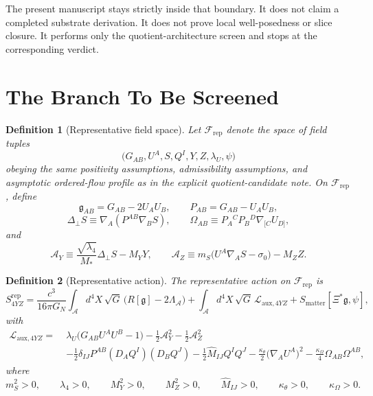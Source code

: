 \documentclass[11pt]{article}
\newcommand{\Sub}{\mathcal{A}}
\newcommand{\BridgeMetric}{\mathfrak{g}}
\newcommand{\AY}{\mathcal A_Y}
\newcommand{\AZ}{\mathcal A_Z}
\newcommand{\FieldSpace}{\mathscr F}
\newcommand{\RepFieldSpace}{\FieldSpace_{\mathrm{rep}}}
\newtheorem{definition}{Definition}
\begin{document}
The present manuscript stays strictly inside that boundary. It does not claim a completed substrate derivation. It does not prove local well-posedness or slice closure. It performs only the quotient-architecture screen and stops at the corresponding verdict.

\section{The Branch To Be Screened}

\begin{definition}[Representative field space]
\label{def:repfield}
Let \(\RepFieldSpace\) denote the space of field tuples
\[
\bigl(G_{AB},U^A,S,Q^I,Y,Z,\lambda_U,\psi\bigr)
\]
obeying the same positivity assumptions, admissibility assumptions, and asymptotic ordered-flow profile as in the explicit quotient-candidate note. On \(\RepFieldSpace\), define
\begin{equation}
\BridgeMetric_{AB}=G_{AB}-2U_AU_B,
\qquad
P_{AB}=G_{AB}-U_AU_B,
\label{eq:bridge}
\end{equation}
\begin{equation}
\Delta_\perp S\equiv \nabla_A(P^{AB}\nabla_BS),
\qquad
\Omega_{AB}\equiv P_A{}^CP_B{}^D\nabla_{[C}U_{D]},
\label{eq:defops}
\end{equation}
and
\begin{equation}
\AY
\equiv
\frac{\sqrt{\lambda_4}}{M_*}\Delta_\perp S-M_YY,
\qquad
\AZ
\equiv
m_S\bigl(U^A\nabla_A S-\sigma_0\bigr)-M_ZZ.
\label{eq:AYAZ}
\end{equation}
\end{definition}

\begin{definition}[Representative action]
\label{def:repaction}
The representative action on \(\RepFieldSpace\) is
\begin{equation}
S_{4YZ}^{\mathrm{rep}}
=
\frac{c^3}{16\pi G_N}
\int_{\Sub} d^4X\,\sqrt{G}\,\bigl(R[\BridgeMetric]-2\Lambda_{\Sub}\bigr)
+\int_{\Sub} d^4X\,\sqrt{G}\,\mathcal L_{\mathrm{aux},4YZ}
+S_{\mathrm{matter}}[\Xi^*\BridgeMetric,\psi],
\label{eq:Srep}
\end{equation}
with
\begin{align}
\mathcal L_{\mathrm{aux},4YZ}
=\;&
\lambda_U\bigl(G_{AB}U^AU^B-1\bigr)
-\frac12\AY^2
-\frac12\AZ^2
\nonumber\\
&-\frac12\delta_{IJ}P^{AB}(D_AQ^I)(D_BQ^J)
-\frac12\widehat M_{IJ}Q^IQ^J
-\frac{\kappa_\theta}{2}\bigl(\nabla_AU^A\bigr)^2
-\frac{\kappa_\Omega}{4}\Omega_{AB}\Omega^{AB},
\label{eq:Lrep}
\end{align}
where
\begin{equation}
m_S^2>0,
\qquad
\lambda_4>0,
\qquad
M_Y^2>0,
\qquad
M_Z^2>0,
\qquad
\widehat M_{IJ}>0,
\qquad
\kappa_\theta>0,
\qquad
\kappa_\Omega>0.
\label{eq:positivity}
\end{equation}
\end{definition}
\end{document}
